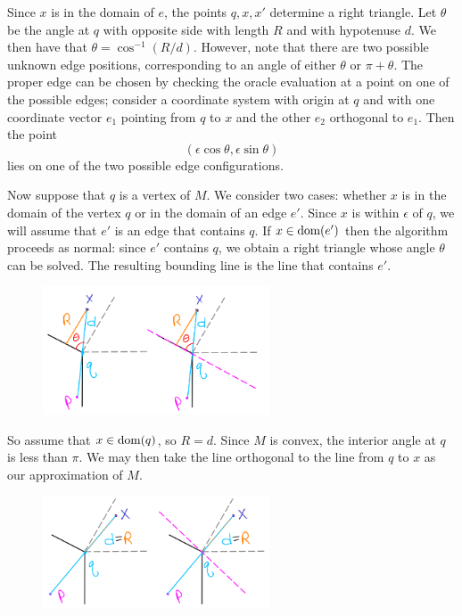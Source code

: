 \documentclass[12pt]{article}
\begin{document}
\begin{flushleft}
Since $x$ is in the domain of $e$, the points $q,x,x'$ determine a right triangle.
Let $\theta$ be the angle at $q$ with opposite side with length $R$ and with hypotenuse $d$.
We then have that $\theta=\cos^{-1}(R/d)$.
However, note that there are two possible unknown edge positions, corresponding to an angle of either $\theta$ or $\pi+\theta$.
The proper edge can be chosen by checking the oracle evaluation at a point on one of the possible edges;
consider a coordinate system with origin at $q$ and with one coordinate vector $e_1$ pointing from $q$ to $x$ and the other $e_2$ orthogonal to $e_1$.
Then the point
\[(\epsilon\cos\theta, \epsilon\sin\theta)\]
lies on one of the two possible edge configurations.

Now suppose that $q$ is a vertex of $M$.
We consider two cases: whether $x$ is in the domain of the vertex $q$ or in the domain of an edge $e'$.
Since $x$ is within $\epsilon$ of $q$, we will assume that $e'$ is an edge that contains $q$.
If $x\in\text{dom}(e')$ then the algorithm proceeds as normal: since $e'$ contains $q$, we obtain a right triangle whose angle $\theta$ can be solved.
The resulting bounding line is the line that contains $e'$.
\begin{figure}[H]
	\centering
	\includegraphics[width=0.6\textwidth]{vertex2.png}
\end{figure}
So assume that $x\in\text{dom}(q)$, so $R=d$.
Since $M$ is convex, the interior angle at $q$ is less than $\pi$.
We may then take the line orthogonal to the line from $q$ to $x$ as our approximation of $M$. 
\begin{figure}[H]
	\centering
	\includegraphics[width=0.6\textwidth]{vertex1.png}
\end{figure}


\end{flushleft}
\end{document}
